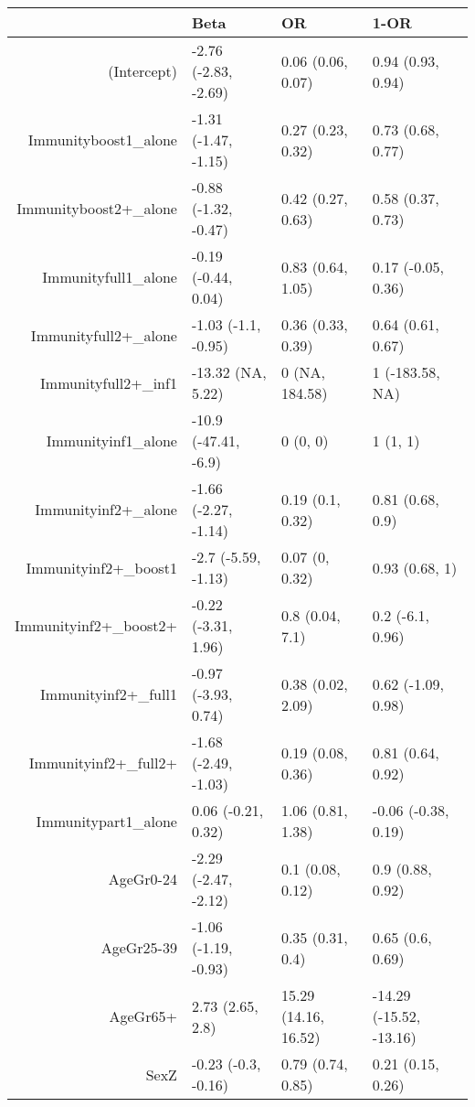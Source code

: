 \begin{table}[ht]
\centering
\begin{tabular}{rlll}
  \hline
 & Beta & OR & 1-OR \\ 
  \hline
(Intercept) & -2.76 (-2.83, -2.69) & 0.06 (0.06, 0.07) & 0.94 (0.93, 0.94) \\ 
  Immunityboost1\_alone & -1.31 (-1.47, -1.15) & 0.27 (0.23, 0.32) & 0.73 (0.68, 0.77) \\ 
  Immunityboost2+\_alone & -0.88 (-1.32, -0.47) & 0.42 (0.27, 0.63) & 0.58 (0.37, 0.73) \\ 
  Immunityfull1\_alone & -0.19 (-0.44, 0.04) & 0.83 (0.64, 1.05) & 0.17 (-0.05, 0.36) \\ 
  Immunityfull2+\_alone & -1.03 (-1.1, -0.95) & 0.36 (0.33, 0.39) & 0.64 (0.61, 0.67) \\ 
  Immunityfull2+\_inf1 & -13.32 (NA, 5.22) & 0 (NA, 184.58) & 1 (-183.58, NA) \\ 
  Immunityinf1\_alone & -10.9 (-47.41, -6.9) & 0 (0, 0) & 1 (1, 1) \\ 
  Immunityinf2+\_alone & -1.66 (-2.27, -1.14) & 0.19 (0.1, 0.32) & 0.81 (0.68, 0.9) \\ 
  Immunityinf2+\_boost1 & -2.7 (-5.59, -1.13) & 0.07 (0, 0.32) & 0.93 (0.68, 1) \\ 
  Immunityinf2+\_boost2+ & -0.22 (-3.31, 1.96) & 0.8 (0.04, 7.1) & 0.2 (-6.1, 0.96) \\ 
  Immunityinf2+\_full1 & -0.97 (-3.93, 0.74) & 0.38 (0.02, 2.09) & 0.62 (-1.09, 0.98) \\ 
  Immunityinf2+\_full2+ & -1.68 (-2.49, -1.03) & 0.19 (0.08, 0.36) & 0.81 (0.64, 0.92) \\ 
  Immunitypart1\_alone & 0.06 (-0.21, 0.32) & 1.06 (0.81, 1.38) & -0.06 (-0.38, 0.19) \\ 
  AgeGr0-24 & -2.29 (-2.47, -2.12) & 0.1 (0.08, 0.12) & 0.9 (0.88, 0.92) \\ 
  AgeGr25-39 & -1.06 (-1.19, -0.93) & 0.35 (0.31, 0.4) & 0.65 (0.6, 0.69) \\ 
  AgeGr65+ & 2.73 (2.65, 2.8) & 15.29 (14.16, 16.52) & -14.29 (-15.52, -13.16) \\ 
  SexZ & -0.23 (-0.3, -0.16) & 0.79 (0.74, 0.85) & 0.21 (0.15, 0.26) \\ 
   \hline
\end{tabular}
\end{table}
